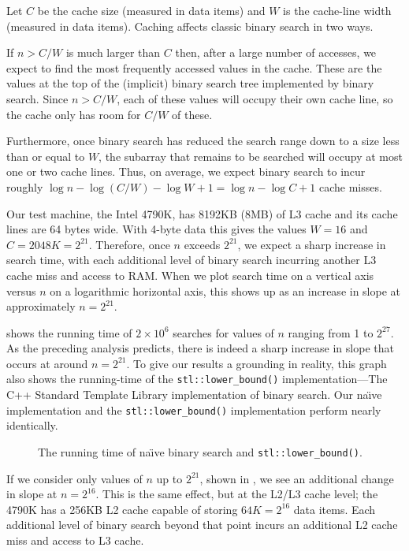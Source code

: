 \documentclass{patmorin}
\begin{document}
Let $C$ be the cache size (measured in data items) and $W$ is the
cache-line width (measured in data items).  Caching affects classic
binary search in two ways.

If $n> C/W$ is much larger than $C$ then, after a large number of
accesses, we expect to find the most frequently accessed values in the
cache.  These are the values at the top of the (implicit) binary search
tree implemented by binary search.  Since $n>C/W$, each of these values
will occupy their own cache line, so the cache only has room for $C/W$
of these.

Furthermore, once binary search has reduced the search range down to a
size less than or equal to $W$, the subarray that remains to be searched
will occupy at most one or two cache lines. Thus, on average, we expect
binary search to incur roughly $\log n -\log(C/W) - \log W + 1 = \log n -
\log C + 1$ cache misses.

Our test machine, the Intel 4790K, has 8192KB (8MB) of L3 cache and its
cache lines are 64 bytes wide.  With 4-byte data this gives the values
$W=16$ and $C=2048K=2^{21}$.  Therefore, once $n$ exceeds $2^{21}$, we
expect a sharp increase in search time, with each additional level of
binary search incurring another L3 cache miss and access to RAM.  When we
plot search time on a vertical axis versus $n$ on a logarithmic horizontal
axis, this shows up as an increase in slope at approximately $n=2^{21}$.

 shows the running time of $2\times 10^6$ searches
for values of $n$ ranging from 1 to $2^{27}$. As the preceding analysis
predicts, there is indeed a sharp increase in slope that occurs at around
$n=2^{21}$.  To give our results a grounding in reality, this graph
also shows the running-time of the \texttt{stl::lower_bound()}
implementation---The C++ Standard Template Library implementation
of binary search.  Our na\"{\i}ve implementation and the
\texttt{stl::lower_bound()} implementation perform nearly
identically.


\begin{figure}
   \caption{The running time of na\"{\i}ve binary search and \texttt{stl::lower_bound()}.}
\end{figure}

If we consider only values of $n$ up to $2^{21}$, shown in
, we see an additional change in slope at
$n=2^{16}$.  This is the same effect, but at the L2/L3 cache level; the
4790K has a 256KB L2 cache capable of storing $64K=2^{16}$ data items.
Each additional level of binary search beyond that point incurs an
additional L2 cache miss and access to L3 cache.
\end{document}
